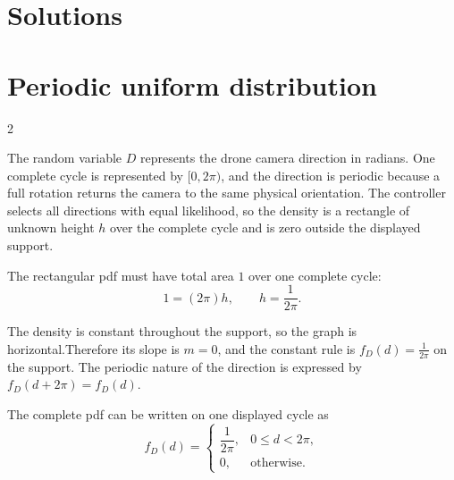	
	\newpage
	\restoregeometry
	
	\vspace*{-15mm}
	
	\section*{Solutions}
	
	
	\section{Periodic uniform distribution}
	
	\setlength{\columnseprule}{0.4pt}
	\begin{multicols}{2}
		
		The random variable $D$ represents the drone camera direction in radians.
		One complete cycle is represented by $[0,2\pi)$, and the direction is
		periodic because a full rotation returns the camera to the same physical
		orientation. The controller selects all directions with equal likelihood,
		so the density is a rectangle of unknown height $h$ over the complete cycle
		and is zero outside the displayed support.
		
		
		\columnbreak
		
		The rectangular pdf must have total area $1$ over one complete cycle:
		\[
		1=(2\pi)h,
		\qquad
		h=\frac1{2\pi}.
		\]
		
		
	\end{multicols}
	\setlength{\columnseprule}{0pt}
	
	
	The density is constant throughout the support, so the graph is horizontal.Therefore its slope is $m=0$, and the constant rule is $f_D(d)=\frac1{2\pi}$ on the support. The periodic nature of the direction is expressed by $f_D(d+2\pi)=f_D(d)$.
	
	
	The complete pdf can be written on one displayed cycle as
	\[
	f_D(d)=
	\begin{cases}
		\dfrac1{2\pi},&0\le d<2\pi,\\[1mm]
		0,&\text{otherwise}.
	\end{cases}
	\]
	
